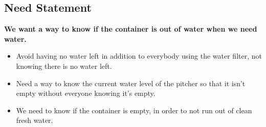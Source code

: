 \subsection{Need Statement}

\textbf{We want a way to know if the container is out of water when we need water. }
\begin{itemize}
    \item Avoid having no water left in addition to everybody using the water filter, not knowing there is no water left.
    \item Need a way to know the current water level of the pitcher so that it isn't empty without everyone knowing it's empty. 
    \item We need to know if the container is empty, in order to not run out of clean fresh water. 
\end{itemize}
